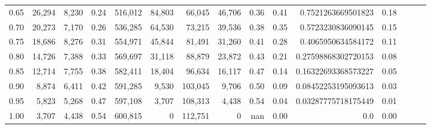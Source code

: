 \begin{tabular}{rrrrrrrrrrrrrrr}
0.65 &  26,294 &  8,230 &  0.24 &  516,012 &   84,803 &   66,045 &   46,706 &  0.36 &  0.41 &   0.7521263669501823 &      0.18 \\
0.70 &  20,273 &  7,170 &  0.26 &  536,285 &   64,530 &   73,215 &   39,536 &  0.38 &  0.35 &   0.5723230836090145 &      0.15 \\
0.75 &  18,686 &  8,276 &  0.31 &  554,971 &   45,844 &   81,491 &   31,260 &  0.41 &  0.28 &   0.4065950634584172 &      0.11 \\
0.80 &  14,726 &  7,388 &  0.33 &  569,697 &   31,118 &   88,879 &   23,872 &  0.43 &  0.21 &  0.27598868302720153 &      0.08 \\
0.85 &  12,714 &  7,755 &  0.38 &  582,411 &   18,404 &   96,634 &   16,117 &  0.47 &  0.14 &  0.16322693368573227 &      0.05 \\
0.90 &   8,874 &  6,411 &  0.42 &  591,285 &    9,530 &  103,045 &    9,706 &  0.50 &  0.09 &  0.08452253195093613 &      0.03 \\
0.95 &   5,823 &  5,268 &  0.47 &  597,108 &    3,707 &  108,313 &    4,438 &  0.54 &  0.04 &  0.03287775718175449 &      0.01 \\
1.00 &   3,707 &  4,438 &  0.54 &  600,815 &        0 &  112,751 &        0 &   nan &  0.00 &                  0.0 &      0.00 \\
\bottomrule
\end{tabular}
